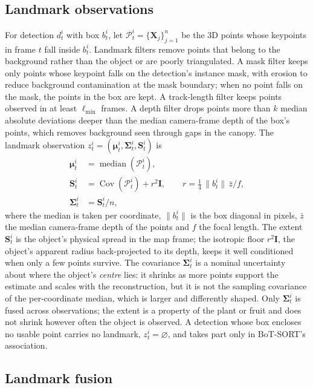 \documentclass[pdflatex,sn-basic]{sn-jnl}%
\theoremstyle{thmstyleone}%
\newcommand{\bmu}{\bm{\mu}}
\newcommand{\bSig}{\bm{\Sigma}}
\newcommand{\bS}{\bm{S}}
\newcommand{\bX}{\bm{X}}
\begin{document}
\subsection{Landmark observations}\label{sec:obs}

For detection $d_t^i$ with box $b_t^i$, let $\mathcal{P}_t^i=\{\bX_j\}_{j=1}^{n}$ be the 3D points whose keypoints in frame $t$ fall inside $b_t^i$. Landmark filters remove points that belong to the background rather than the object or are poorly triangulated. A mask filter keeps only points whose keypoint falls on the detection's instance mask, with erosion to reduce background contamination at the mask boundary; when no point falls on the mask, the points in the box are kept. A track-length filter keeps points observed in at least $\ell_{\min}$ frames. A depth filter drops points more than $k$ median absolute deviations deeper than the median camera-frame depth of the box's points, which removes background seen through gaps in the canopy. The landmark observation $z_t^i=(\bmu_t^i,\bSig_t^i,\bS_t^i)$ is
\begin{align}
\bmu_t^i &= \operatorname{median}(\mathcal{P}_t^i), \label{eq:mu}\\
\bS_t^i &= \operatorname{Cov}(\mathcal{P}_t^i) + r^2\bm{I}, \qquad r=\tfrac{1}{4}\,\lVert b_t^i\rVert\,\bar{z}/f, \label{eq:extent}\\
\bSig_t^i &= \bS_t^i / n, \label{eq:cov}
\end{align}
where the median is taken per coordinate, $\lVert b_t^i\rVert$ is the box diagonal in pixels, $\bar z$ the median camera-frame depth of the points and $f$ the focal length. The extent $\bS_t^i$ is the object's physical spread in the map frame; the isotropic floor $r^2\bm{I}$, the object's apparent radius back-projected to its depth, keeps it well conditioned when only a few points survive. The covariance $\bSig_t^i$ is a nominal uncertainty about where the object's \emph{centre} lies: it shrinks as more points support the estimate and scales with the reconstruction, but it is not the sampling covariance of the per-coordinate median, which is larger and differently shaped. Only $\bSig_t^i$ is fused across observations; the extent is a property of the plant or fruit and does not shrink however often the object is observed. A detection whose box encloses no usable point carries no landmark, $z_t^i=\varnothing$, and takes part only in BoT-SORT's association.

\subsection{Landmark fusion}\label{sec:fusion}
\end{document}
